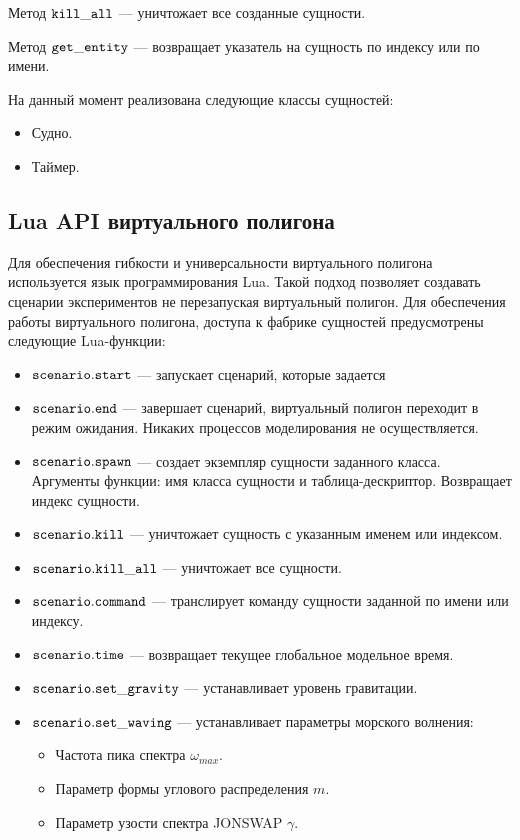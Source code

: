 Метод $\tt kill\_all$ --- уничтожает все созданные сущности.

Метод $\tt get\_entity$ --- возвращает указатель на сущность по индексу или по имени.

На данный момент реализована следующие классы сущностей:
\begin{itemize}
	\item	Судно.
	\item 	Таймер.
\end{itemize}

%

\subsection{Lua API виртуального полигона}

Для обеспечения гибкости и универсальности виртуального полигона используется язык программирования Lua.
Такой подход позволяет создавать сценарии экспериментов  не перезапуская виртуальный полигон.
Для обеспечения работы виртуального полигона, доступа к фабрике сущностей предусмотрены следующие Lua-функции:

\begin{itemize}
	\item $\tt scenario.start$ --- запускает сценарий, которые задается 	
	\item $\tt scenario.end$ --- завершает сценарий, виртуальный полигон переходит в 
	режим ожидания. Никаких процессов моделирования не осуществляется.
	\item $\tt scenario.spawn$ --- создает экземпляр сущности заданного класса. Аргументы функции: имя класса сущности и таблица-дескриптор. Возвращает индекс сущности.
	\item $\tt scenario.kill$ --- уничтожает сущность с указанным именем или индексом.
	\item $\tt scenario.kill\_all$ --- уничтожает все сущности.
	\item $\tt scenario.command$ --- транслирует команду сущности заданной по имени или индексу.
	\item $\tt scenario.time$ --- возвращает текущее глобальное модельное время.
	\item $\tt scenario.set\_gravity$ --- устанавливает уровень гравитации.
	\item $\tt scenario.set\_waving$ --- устанавливает параметры морского волнения:
		\begin{itemize}
		\item Частота пика спектра $\omega_{max}$.
		\item Параметр формы углового распределения $m$.
		\item Параметр узости спектра JONSWAP $\gamma$.
		\end{itemize}
\end{itemize}



